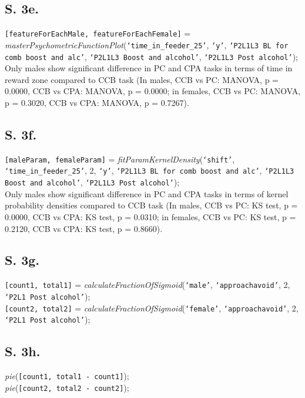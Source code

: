 \documentclass{article}
\begin{document}
\subsection{S. 3e.}
\texttt{[featureForEachMale, featureForEachFemale]} = \emph{masterPsychometricFunctionPlot}(\texttt{`time\_in\_feeder\_25'}, \texttt{`y'}, \texttt{`P2L1L3 BL for comb boost and alc'}, \texttt{`P2L1L3 Boost and alcohol'}, \texttt{`P2L1L3 Post alcohol'});\\

Only males show significant difference in PC and CPA tasks in terms of time in reward zone compared to CCB task (In males, CCB vs PC: MANOVA, p = 0.0000, CCB vs CPA: MANOVA, p = 0.0000; in females, CCB vs PC: MANOVA, p = 0.3020, CCB vs CPA: MANOVA, p = 0.7267).

\subsection{S. 3f.}
\texttt{[maleParam, femaleParam]} = \emph{fitParamKernelDensity}(\texttt{`shift'}, \texttt{`time\_in\_feeder\_25'}, 2, \texttt{`y'}, \texttt{`P2L1L3 BL for comb boost and alc'}, \texttt{`P2L1L3 Boost and alcohol'}, \texttt{`P2L1L3 Post alcohol'});\\

Only males show significant difference in PC and CPA tasks in terms of kernel probability densities compared to CCB task (In males, CCB vs PC: KS test, p = 0.0000, CCB vs CPA: KS test, p = 0.0310; in females, CCB vs PC: KS test, p = 0.2120, CCB vs CPA: KS test, p = 0.8660).

\subsection{S. 3g.}
\texttt{[count1, total1]} = \emph{calculateFractionOfSigmoid}(\texttt{`male'}, \texttt{`approachavoid'}, 2, \texttt{`P2L1 Post alcohol'});\\
\texttt{[count2, total2]} = \emph{calculateFractionOfSigmoid}(\texttt{`female'}, \texttt{`approachavoid'}, 2, \texttt{`P2L1 Post alcohol'});\\

\subsection{S. 3h.}
\emph{pie}(\texttt{[count1, total1 - count1]});\\
\emph{pie}(\texttt{[count2, total2 - count2]});\\
\end{document}
